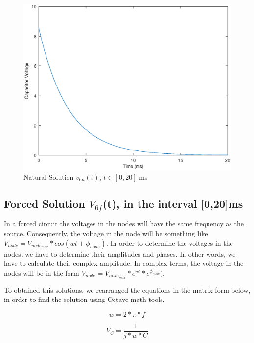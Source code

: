 \begin{figure}[h] \centering
\includegraphics[width=0.7\linewidth]{naturalsolution.eps}
\caption{Natural Solution $v_{6n}(t)$, $t\in[0,20]$ ms}
\label{fig:snat}
\end{figure}



\subsection{Forced Solution $V_{6f}$(t), in the interval [0,20]ms}

\par In a forced circuit the voltages in the nodes will have the same frequency as the source. Consequently, the voltage in the node will be something like $V_{node} = V_{node_{max}}*cos(wt + \phi_{node})$. In order to determine the voltages in the nodes, we have to determine their amplitudes and phases. In other words, we have to calculate their complex amplitude. In complex terms, the voltage in the nodes will be in the form $V_{node} =
V_{node_{max}}*e^{wt}*e^{\phi_{node}})$.

\par To obtained this solutions, we rearranged the equations in the matrix form below, in order to find the solution using Octave math tools.

\begin{equation}
    w= 2*\pi*f
\end{equation}

\begin{equation}
    V_C = \frac{1}{j*w*C}
\end{equation}

